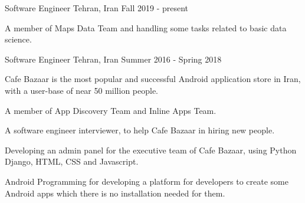 

\begin{cventries}

 \cventry
    {Software Engineer} %
    {} %
    {Tehran, Iran} %
    {Fall 2019 - present} %
    {
      \begin{cvitems} %
        \item {A member of Maps Data Team and handling some tasks related to basic data science.}
      \end{cvitems}
    }

  \cventry
    {Software Engineer} %
    {} %
    {Tehran, Iran} %
    {Summer 2016 - Spring 2018} %
    {
      \begin{cvitems} %
        \item {Cafe Bazaar is the most popular and successful Android application store in Iran, with a user-base of near 50 million people.}
        \item {A member of App Discovery Team and Inline Apps Team.}
        \item {A software engineer interviewer, to help Cafe Bazaar in hiring new people.}
        \item {Developing an admin panel for the executive team of Cafe Bazaar, using Python Django, HTML, CSS and Javascript.}
        \item {Android Programming for developing a platform for developers to create some Android apps which there is no installation needed for them.}
      \end{cvitems}
    }


\end{cventries}
